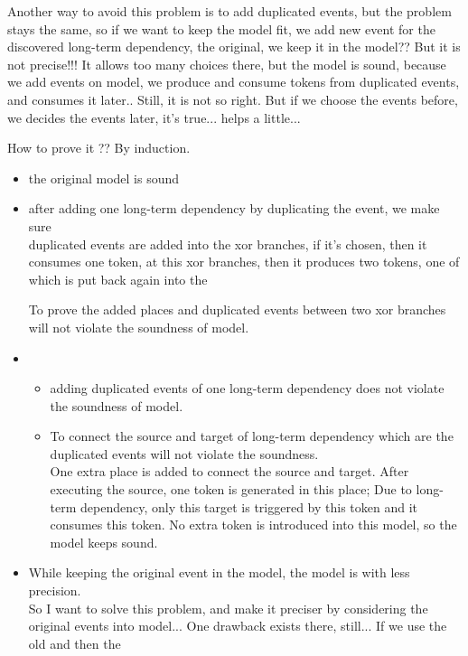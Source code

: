 \documentclass[]{article}
\begin{document}
Another way to avoid this problem is to add duplicated events, but the problem stays the same, so if we want to keep the model fit, we add new event for the discovered long-term dependency, the original, we keep it in the model?? But it is not precise!!! It allows too many choices there, but the model is sound, because we add events on model, we produce and consume tokens from duplicated events, and consumes it later.. Still, it is not so right. But if we choose the events before, we decides the events later, it's true... helps a little... 

How to prove it ?? By induction. 
\begin{itemize}
	\item the original model is sound
	\item after adding one long-term dependency by duplicating the event, we make sure
	 \\ duplicated events are added into the xor branches, if it's chosen, then it consumes one token, at this xor branches, then it produces two tokens, one of which is put back again into the 
	 
	 
	 To prove the added places and duplicated events between two xor branches will not violate the soundness of model. 
	 \item 
	 \begin{itemize}
	 	\item adding duplicated events of one long-term dependency does not violate the soundness of model. 
	 	
	 	\item To connect the source and target  of long-term dependency which are the duplicated events will not violate the soundness.
	 	\\ One extra place is added to connect the source and target. After executing the source, one token is generated in this place; Due to long-term dependency, only this target is triggered by this token and it consumes this token. No extra token is introduced into this model, so the model keeps sound. 
	 	
	 \end{itemize}
	 
	 \item While keeping the original event in the model,  the model is with less precision.  
	 \\ 
	 So I want to solve this problem, and make it preciser by considering the original events into model... 
	 One drawback exists there, still... If we use the old and then the 
\end{itemize}
\end{document}
